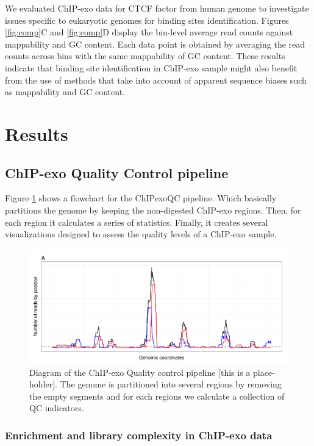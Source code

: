\documentclass[11pt]{article}\usepackage[]{graphicx}\usepackage[]{color}
\begin{document}
We evaluated ChIP-exo data for CTCF factor from human genome
\cite{exo1} to investigate issues specific to eukaryotic genomes for
binding sites identification. Figures \ref{fig:comp}C and
\ref{fig:comp}D display the bin-level average read counts against
mappability and GC content. Each data point is obtained by averaging
the read counts across bins with the same mappability of GC
content. These results indicate that binding site identification in
ChIP-exo sample might also benefit from the use of methods that take
into account of apparent sequence biases such as mappability and GC
content.

\section{Results}
\label{sec:results}

\subsection{ChIP-exo Quality Control pipeline}
\label{sec:QC}

Figure \ref{fig:qcdiagram} shows a flowchart for the ChIPexoQC
pipeline. Which basically partitions the genome by keeping the
non-digested ChIP-exo regions. Then, for each region it calculates a
series of statistics. Finally, it creates several visualizations
designed to assess the quality levels of a ChIP-exo sample.

\begin{figure}[H]
  \centering
  \includegraphics[width = .9\textwidth]{../figs/for_paper/coverage_diagram.pdf}
  \caption{Diagram of the ChIP-exo Quality control pipeline [this is a
    place-holder]. The genome is partitioned into several regions by
    removing the empty segments and for each regions we calculate a
    collection of QC indicators.}
  \label{fig:qcdiagram}
\end{figure}

\subsubsection{Enrichment and library complexity in ChIP-exo data}
\label{sec:enri}
\end{document}
